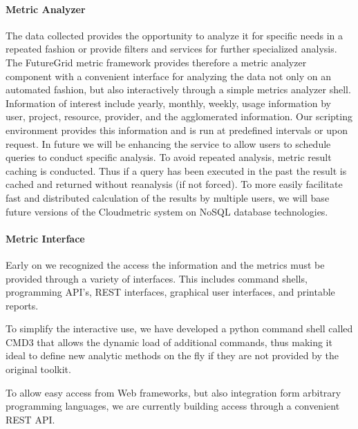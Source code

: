 \documentclass{tex/sig-alternate-2013}
\newcommand{\todo}[1]{{\color{red}{#1}}}
\begin{document}
{\paragraph{Metric Analyzer}


\todo{READ}

The data collected provides the opportunity to analyze it for specific
needs in a repeated fashion or provide filters and services for
further specialized analysis. The FutureGrid metric framework provides
therefore a metric analyzer component with a convenient interface for
analyzing the data not only on an automated fashion, but also
interactively through a simple metrics analyzer shell. Information of
interest include yearly, monthly, weekly, usage information by user,
project, resource, provider, and the agglomerated information. Our
scripting environment provides this information and is run at
predefined intervals or upon request. In future we will be enhancing
the service to allow users to schedule queries to conduct specific
analysis. To avoid repeated analysis, metric result caching is
conducted. Thus if a query has been executed in the past the result is
cached and returned without reanalysis (if not forced). To more easily
facilitate fast and distributed calculation of the results by multiple
users, we will base future versions of the Cloudmetric system on NoSQL
database technologies. 

\paragraph{Metric Interface}


\todo{READ}

Early on we recognized the access the information and the metrics must
be provided through a variety of interfaces. This includes command
shells, programming API's, REST interfaces, graphical user interfaces,
and printable reports.

\begin{description}[leftmargin=*,itemsep=0pt,topsep=0pt]

\item[Interactive Command Shell.] To simplify the interactive use,
we have developed a python command shell called CMD3 that allows the
dynamic load of additional commands, thus making it ideal to define
new analytic methods on the fly if they are not provided by the
original toolkit.

\item[REST API.] To allow easy access from Web frameworks, but
also integration form arbitrary programming languages, we are
currently building access through a convenient REST API.


\end{description}}
\end{document}
